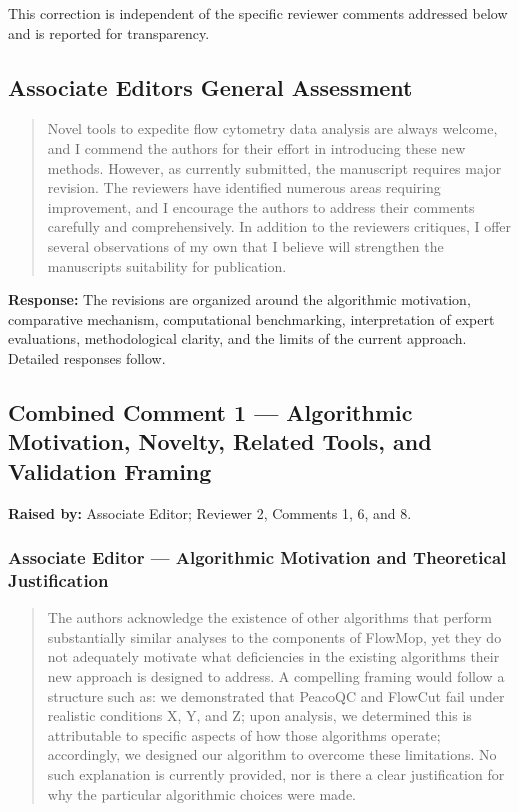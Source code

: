 \documentclass[
  11pt,
  a4paper,
]{article}
\begin{document}
This correction is independent of the specific reviewer comments
addressed below and is reported for transparency.

\subsection{Associate Editor\textquotesingle s General
Assessment}\label{associate-editors-general-assessment}

\begin{quote}
Novel tools to expedite flow cytometry data analysis are always welcome,
and I commend the authors for their effort in introducing these new
methods. However, as currently submitted, the manuscript requires major
revision. The reviewers have identified numerous areas requiring
improvement, and I encourage the authors to address their comments
carefully and comprehensively. In addition to the
reviewers\textquotesingle{} critiques, I offer several observations of
my own that I believe will strengthen the manuscript\textquotesingle s
suitability for publication.
\end{quote}

\textbf{Response:} The revisions are organized around the algorithmic
motivation, comparative mechanism, computational benchmarking,
interpretation of expert evaluations, methodological clarity, and the
limits of the current approach. Detailed responses follow.

\subsection{Combined Comment 1 --- Algorithmic Motivation, Novelty,
Related Tools, and Validation
Framing}\label{combined-comment-1--algorithmic-motivation-novelty-related-tools-and-validation-framing}

\textbf{Raised by:} Associate Editor; Reviewer 2, Comments 1, 6, and 8.

\subsubsection{Associate Editor --- Algorithmic Motivation and
Theoretical
Justification}\label{associate-editor--algorithmic-motivation-and-theoretical-justification}

\begin{quote}
The authors acknowledge the existence of other algorithms that perform
substantially similar analyses to the components of FlowMop, yet they do
not adequately motivate what deficiencies in the existing algorithms
their new approach is designed to address. A compelling framing would
follow a structure such as: we demonstrated that PeacoQC and FlowCut
fail under realistic conditions X, Y, and Z; upon analysis, we
determined this is attributable to specific aspects of how those
algorithms operate; accordingly, we designed our algorithm to overcome
these limitations. No such explanation is currently provided, nor is
there a clear justification for why the particular algorithmic choices
were made.
\end{quote}
\end{document}
